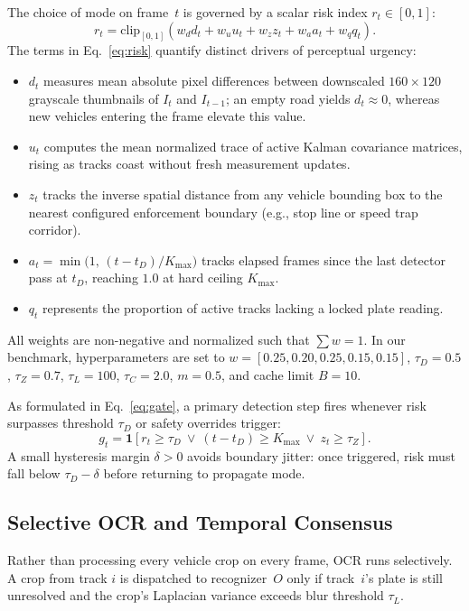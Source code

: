 The choice of mode on frame~$t$ is governed by a scalar risk index $r_t \in [0, 1]$:
\begin{equation}
 r_t = \mathrm{clip}_{[0,1]}(w_d d_t + w_u u_t + w_z z_t + w_a a_t + w_q q_t).
 \label{eq:risk}
\end{equation}
The terms in Eq.~\eqref{eq:risk} quantify distinct drivers of perceptual urgency:
\begin{itemize}
  \item $d_t$ measures mean absolute pixel differences between downscaled $160{\times}120$ grayscale thumbnails of $I_t$ and $I_{t-1}$; an empty road yields $d_t \approx 0$, whereas new vehicles entering the frame elevate this value.
  \item $u_t$ computes the mean normalized trace of active Kalman covariance matrices, rising as tracks coast without fresh measurement updates.
  \item $z_t$ tracks the inverse spatial distance from any vehicle bounding box to the nearest configured enforcement boundary (e.g., stop line or speed trap corridor).
  \item $a_t = \min\bigl(1,\,(t - t_D)/K_{\max}\bigr)$ tracks elapsed frames since the last detector pass at $t_D$, reaching $1.0$ at hard ceiling $K_{\max}$.
  \item $q_t$ represents the proportion of active tracks lacking a locked plate reading.
\end{itemize}
All weights are non-negative and normalized such that $\sum w = 1$. In our benchmark, hyperparameters are set to $w = [0.25, 0.20, 0.25, 0.15, 0.15]$, $\tau_D = 0.5$, $\tau_Z = 0.7$, $\tau_L = 100$, $\tau_C = 2.0$, $m = 0.5$, and cache limit $B = 10$.

As formulated in Eq.~\eqref{eq:gate}, a primary detection step fires whenever risk surpasses threshold $\tau_D$ or safety overrides trigger:
\begin{equation}
 g_t = \mathbf{1}[r_t \ge \tau_D \ \lor \ (t - t_D) \ge K_{\max} \ \lor \ z_t \ge \tau_Z].
 \label{eq:gate}
\end{equation}
A small hysteresis margin $\delta > 0$ avoids boundary jitter: once triggered, risk must fall below $\tau_D - \delta$ before returning to propagate mode.

\subsection{Selective OCR and Temporal Consensus}
Rather than processing every vehicle crop on every frame, OCR runs selectively. A crop from track $i$ is dispatched to recognizer~$O$ only if track~$i$'s plate is still unresolved and the crop's Laplacian variance exceeds blur threshold $\tau_L$.

